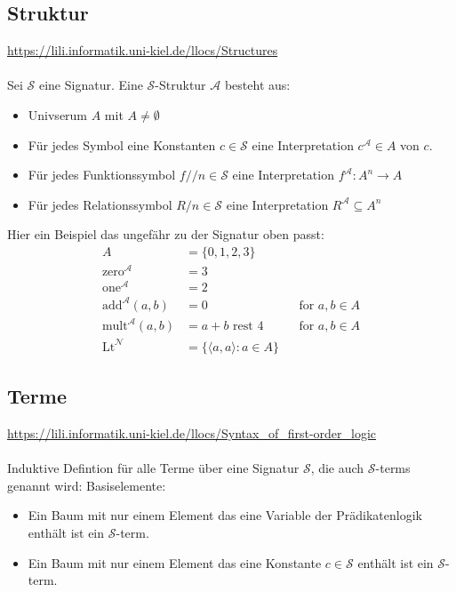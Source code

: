 \documentclass[twocolumn]{article}
\begin{document}
    \subsection{Struktur}
    \url{https://lili.informatik.uni-kiel.de/llocs/Structures}\\\\
    Sei $\mathcal S$ eine Signatur. Eine $\mathcal S$-Struktur $\mathcal A$ besteht aus:
    \begin{itemize}
        \item Univserum $A$ mit $A \not= \emptyset$
        \item Für jedes Symbol eine Konstanten $c \in \mathcal{S}$ eine Interpretation $c^\mathcal A \in A$ von $c$.
        \item Für jedes Funktionssymbol $f/\!/n \in \mathcal S$ eine Interpretation $f^\mathcal A \colon A^n \to A$
        \item Für jedes Relationssymbol $R/n \in \mathcal S$ eine Interpretation $R^\mathcal A \subseteq A^n$
    \end{itemize}
    Hier ein Beispiel das ungefähr zu der Signatur oben passt:\\
    \begin{align*}
        A & = \{0, 1, 2, 3\} \\
        \text{zero}^\mathcal A & = 3\\
        \text{one}^\mathcal A & = 2\\
        \text{add}^\mathcal A(a,b) & = 0 && \text{for $a, b \in A$}\\
        \text{mult}^\mathcal A(a,b) & = a + b \text{ rest } 4 && \text{for $a, b \in A$}\\
        \text{Lt}^\mathcal N & = \{\langle a, a\rangle \colon a \in A\}
    \end{align*}

    \subsection{Terme}
    \url{https://lili.informatik.uni-kiel.de/llocs/Syntax_of_first-order_logic}\\\\
    Induktive Defintion für alle Terme über eine Signatur $\mathcal{S}$, die auch $\mathcal{S}$-terms genannt wird:
    Basiselemente:\\
    \begin{itemize}
        \item Ein Baum mit nur einem Element das eine Variable der Prädikatenlogik enthält ist ein $\mathcal{S}$-term.
        \item Ein Baum mit nur einem Element das eine Konstante $c \in \mathcal{S}$ enthält ist ein $\mathcal{S}$-term.
    \end{itemize}
\end{document}
